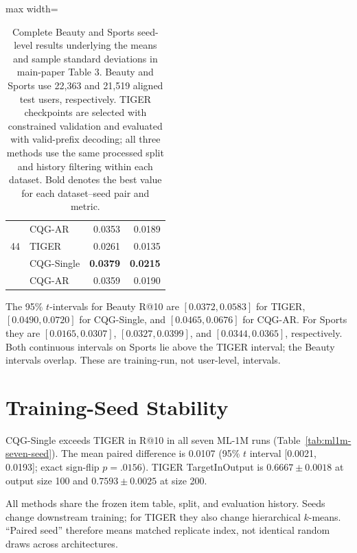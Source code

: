 \documentclass[preprint,12pt]{elsarticle}
\begin{document}
\begin{table}[htbp]
\begin{minipage}[t]{0.48\textwidth}
\begin{adjustbox}{max width=\linewidth}
\begin{tabular}{llrr}
 & CQG-AR & 0.0353 & 0.0189 \\
44 & TIGER & 0.0261 & 0.0135 \\
 & CQG-Single & \textbf{0.0379} & \textbf{0.0215} \\
 & CQG-AR & 0.0359 & 0.0190 \\
\bottomrule
\end{tabular}
\end{adjustbox}
\end{minipage}
\caption{Complete Beauty and Sports seed-level results underlying the means
and sample standard deviations in main-paper Table 3. Beauty and Sports use
22,363 and 21,519 aligned test users, respectively. TIGER checkpoints are
selected with constrained validation and evaluated with valid-prefix
decoding; all three methods use the same processed split and history
filtering within each dataset. Bold denotes the best value for each
dataset--seed pair and metric.}
\label{tab:auto-tiger-results}
\end{table}

The 95\% \(t\)-intervals for Beauty R@10 are
\([0.0372,0.0583]\) for TIGER, \([0.0490,0.0720]\) for CQG-Single, and
\([0.0465,0.0676]\) for CQG-AR. For Sports they are
\([0.0165,0.0307]\), \([0.0327,0.0399]\), and
\([0.0344,0.0365]\), respectively. Both continuous intervals on Sports lie
above the TIGER interval; the Beauty intervals overlap. These are
training-run, not user-level, intervals.

\section{Training-Seed Stability}
\label{app:seed-stability}

CQG-Single exceeds TIGER in R@10 in all seven ML-1M runs
(Table~\ref{tab:ml1m-seven-seed}). The mean paired difference is 0.0107
(95\% $t$ interval [0.0021, 0.0193]; exact sign-flip $p=.0156$).
TIGER TargetInOutput is \(0.6667\pm0.0018\) at output size 100 and
\(0.7593\pm0.0025\) at size 200.

All methods share the frozen item table, split, and evaluation history.
Seeds change downstream training; for TIGER they also change hierarchical
$k$-means. ``Paired seed'' therefore means matched replicate index, not
identical random draws across architectures.
\end{document}
